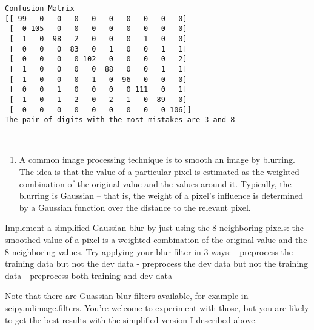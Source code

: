 \documentclass[11pt]{article}
\providecommand{\tightlist}{%
      \setlength{\itemsep}{0pt}\setlength{\parskip}{0pt}}
\begin{document}
    \begin{Verbatim}[commandchars=\\\{\}]
Confusion Matrix
[[ 99   0   0   0   0   0   0   0   0   0]
 [  0 105   0   0   0   0   0   0   0   0]
 [  1   0  98   2   0   0   0   1   0   0]
 [  0   0   0  83   0   1   0   0   1   1]
 [  0   0   0   0 102   0   0   0   0   2]
 [  1   0   0   0   0  88   0   0   1   1]
 [  1   0   0   0   1   0  96   0   0   0]
 [  0   0   1   0   0   0   0 111   0   1]
 [  1   0   1   2   0   2   1   0  89   0]
 [  0   0   0   0   0   0   0   0   0 106]]
The pair of digits with the most mistakes are 3 and 8

    \end{Verbatim}

    \begin{center}
    \end{center}
    { \hspace*{\fill} \\}
    
    \begin{enumerate}
\def\labelenumi{(\arabic{enumi})}
\setcounter{enumi}{5}
\tightlist
\item
  A common image processing technique is to smooth an image by blurring.
  The idea is that the value of a particular pixel is estimated as the
  weighted combination of the original value and the values around it.
  Typically, the blurring is Gaussian -- that is, the weight of a
  pixel's influence is determined by a Gaussian function over the
  distance to the relevant pixel.
\end{enumerate}

Implement a simplified Gaussian blur by just using the 8 neighboring
pixels: the smoothed value of a pixel is a weighted combination of the
original value and the 8 neighboring values. Try applying your blur
filter in 3 ways: - preprocess the training data but not the dev data -
preprocess the dev data but not the training data - preprocess both
training and dev data

Note that there are Guassian blur filters available, for example in
scipy.ndimage.filters. You're welcome to experiment with those, but you
are likely to get the best results with the simplified version I
described above.
\end{document}
